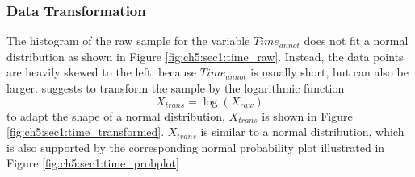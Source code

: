 \subsubsection{Data Transformation}

The histogram of the raw sample for the variable $Time_{annot}$ does not fit a normal distribution as shown in Figure \ref{fig:ch5:sec1:time_raw}.
Instead, the data points are heavily skewed to the left, because $Time_{annot}$ is usually short, but can also be larger.
\cite{PS16-Statistics} suggests to transform the sample by the logarithmic function 
\begin{equation} \label{equ:trans_time}
	X_{trans} = \log \left( X_{raw} \right) 
\end{equation}
to adapt the shape of a normal distribution, $X_{trans}$ is shown in Figure \ref{fig:ch5:sec1:time_transformed}.
$X_{trans}$ is similar to a normal distribution, which is also supported by the corresponding normal probability plot illustrated in Figure \ref{fig:ch5:sec1:time_probplot}


